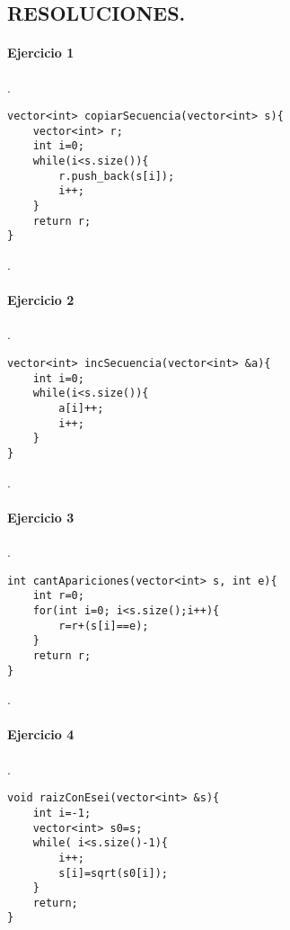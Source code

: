 \documentclass{article}
\begin{document}
\renewcommand{\thelstlisting}{\thesection.\arabic{lstlisting}}



\begin{center}
\section*{RESOLUCIONES.}
\end{center}
\paragraph{Ejercicio 1}.

\begin{lstlisting}
vector<int> copiarSecuencia(vector<int> s){
	vector<int> r;
	int i=0;
	while(i<s.size()){
		r.push_back(s[i]);
		i++;	
	}
	return r;
}
\end{lstlisting}
.
\paragraph*{Ejercicio 2}.

\begin{lstlisting}
vector<int> incSecuencia(vector<int> &a){
	int i=0;
	while(i<s.size()){
		a[i]++;
		i++;	
	}
}
\end{lstlisting}
.
\paragraph*{Ejercicio 3}.

\begin{lstlisting}
int cantApariciones(vector<int> s, int e){
	int r=0;
	for(int i=0; i<s.size();i++){
		r=r+(s[i]==e);
	}
	return r;
}
\end{lstlisting}
.
\paragraph*{Ejercicio 4}.

\begin{lstlisting}
void raizConEsei(vector<int> &s){
	int i=-1;
	vector<int> s0=s;
	while( i<s.size()-1){
		i++;
		s[i]=sqrt(s0[i]);
	}
	return;
}
\end{lstlisting}
\end{document}
